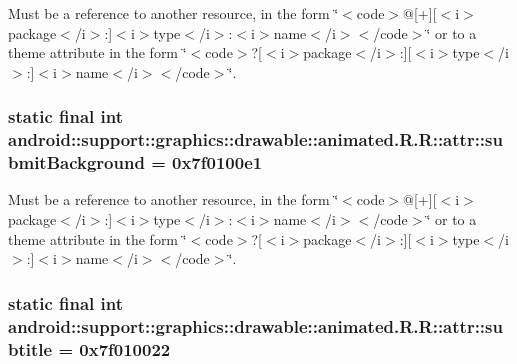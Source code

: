 Must be a reference to another resource, in the form \char`\"{}$<$code$>$@\mbox{[}+\mbox{]}\mbox{[}$<$i$>$package$<$/i$>$:\mbox{]}$<$i$>$type$<$/i$>$:$<$i$>$name$<$/i$>$$<$/code$>$\char`\"{} or to a theme attribute in the form \char`\"{}$<$code$>$?\mbox{[}$<$i$>$package$<$/i$>$:\mbox{]}\mbox{[}$<$i$>$type$<$/i$>$:\mbox{]}$<$i$>$name$<$/i$>$$<$/code$>$\char`\"{}. \hypertarget{classandroid_1_1support_1_1graphics_1_1drawable_1_1animated_1_1_r_1_1attr_83f6e4cb86cec9799453c5f1b421e7c4}{
\subsubsection[{submitBackground}]{\setlength{\rightskip}{0pt plus 5cm}static final int android::support::graphics::drawable::animated.R.R::attr::submitBackground = 0x7f0100e1}}
\label{classandroid_1_1support_1_1graphics_1_1drawable_1_1animated_1_1_r_1_1attr_83f6e4cb86cec9799453c5f1b421e7c4}


Must be a reference to another resource, in the form \char`\"{}$<$code$>$@\mbox{[}+\mbox{]}\mbox{[}$<$i$>$package$<$/i$>$:\mbox{]}$<$i$>$type$<$/i$>$:$<$i$>$name$<$/i$>$$<$/code$>$\char`\"{} or to a theme attribute in the form \char`\"{}$<$code$>$?\mbox{[}$<$i$>$package$<$/i$>$:\mbox{]}\mbox{[}$<$i$>$type$<$/i$>$:\mbox{]}$<$i$>$name$<$/i$>$$<$/code$>$\char`\"{}. \hypertarget{classandroid_1_1support_1_1graphics_1_1drawable_1_1animated_1_1_r_1_1attr_4b9fa484d1e7786c383b0b67c96b9753}{
\subsubsection[{subtitle}]{\setlength{\rightskip}{0pt plus 5cm}static final int android::support::graphics::drawable::animated.R.R::attr::subtitle = 0x7f010022}}
\label{classandroid_1_1support_1_1graphics_1_1drawable_1_1animated_1_1_r_1_1attr_4b9fa484d1e7786c383b0b67c96b9753}


